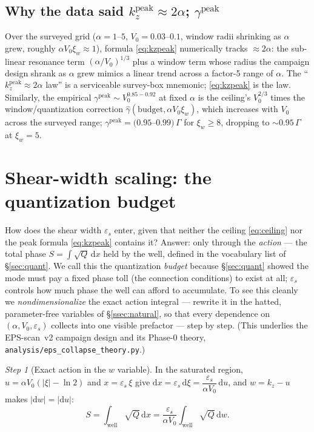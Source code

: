 \documentclass[11pt,a4paper]{article}
\numberwithin{equation}{section}
\theoremstyle{remark}
\newtheorem{step}{Step}[subsection]
\newcommand{\eps}{\varepsilon_s}                 %
\newcommand{\Vo}{V_0}
\newcommand{\kz}{k_z}
\newcommand{\Ceil}{\Gamma}                        %
\newcommand{\dd}{\mathrm{d}}
\begin{document}
\subsection{Why the data said $\kz^{\mathrm{peak}}\approx2\alpha$;
$\gamma^{\mathrm{peak}}$}
\label{ssec:2alpha}

Over the surveyed grid ($\alpha=1$--$5$, $\Vo=0.03$--$0.1$, window radii
shrinking as $\alpha$ grew, roughly $\alpha\Vo\xi_w\approx1$), formula
\eqref{eq:kzpeak} numerically tracks $\approx2\alpha$: the sub-linear
resonance term $(\alpha/\Vo)^{1/3}$ plus a window term whose radius the
campaign design shrank as $\alpha$ grew mimics a linear trend across a
factor-5 range of $\alpha$. The ``$\kz^{\mathrm{peak}}\approx2\alpha$
law'' is a serviceable survey-box mnemonic; \eqref{eq:kzpeak} is the law.
Similarly, the empirical $\gamma^{\mathrm{peak}}\sim\Vo^{0.85-0.92}$ at
fixed $\alpha$ is the ceiling's $\Vo^{2/3}$ times the window/quantization
correction $\hat\gamma(\text{budget},\alpha\Vo\xi_w)$, which increases
with $\Vo$ across the surveyed range;
$\gamma^{\mathrm{peak}}=(0.95$--$0.99)\,\Ceil$ for $\xi_w\ge8$, dropping
to ${\sim}0.95\,\Ceil$ at $\xi_w=5$.

\section{Shear-width scaling: the quantization budget}
\label{sec:budget}

How does the shear width $\eps$ enter, given that neither the ceiling
\eqref{eq:ceiling} nor the peak formula \eqref{eq:kzpeak} contains it?
Answer: only through the \emph{action} --- the total phase
$S=\int\sqrt{Q}\,\dd x$ held by the well, defined in the vocabulary
list of \S\ref{sec:quant}. We call this the quantization \emph{budget}
because \S\ref{sec:quant} showed the mode must pay a fixed phase toll
(the connection conditions) to exist at all; $\eps$ controls how much
phase the well can afford to accumulate. To see this cleanly we
\emph{nondimensionalize} the exact action integral --- rewrite it in
the hatted, parameter-free variables of \S\ref{ssec:natural}, so that
every dependence on $(\alpha,\Vo,\eps)$ collects into one visible
prefactor --- step by step. (This underlies the EPS-scan~v2
campaign design and its Phase-0 theory,
\texttt{analysis/eps\_collapse\_theory.py}.)

\begin{step}[Exact action in the $w$ variable]
In the saturated region, $u=\alpha\Vo(|\xi|-\ln2)$ and $x=\eps\,\xi$ give
$\dd x=\eps\,\dd\xi=\dfrac{\eps}{\alpha\Vo}\,\dd u$, and $w=\kz-u$ makes
$|\dd w|=|\dd u|$:
\begin{equation}
S=\int_{\mathrm{well}}\sqrt{Q}\,\dd x
=\frac{\eps}{\alpha\Vo}\int_{\mathrm{well}}\sqrt{Q}\,\dd w .
\end{equation}
\end{step}
\end{document}
